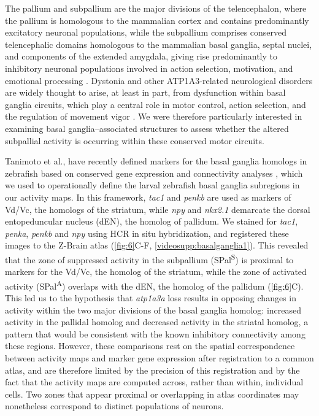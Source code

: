 \documentclass[9.5pt,lineno]{RandlettLab_elife}
\begin{document}
The pallium and subpallium are the major divisions of the telencephalon, where the pallium is homologous to the mammalian cortex and contains predominantly excitatory neuronal populations, while the subpallium comprises conserved telencephalic domains homologous to the mammalian basal ganglia, septal nuclei, and components of the extended amygdala, giving rise predominantly to inhibitory neuronal populations involved in action selection, motivation, and emotional processing \citep{Wullimann2004}.
Dystonia and other ATP1A3-related neurological disorders are widely thought to arise, at least in part, from dysfunction within basal ganglia circuits, which play a central role in motor control, action selection, and the regulation of movement vigor \citep{Brggemann2021}. 
We were therefore particularly interested in examining basal ganglia–associated structures to assess whether the altered subpallial activity is occurring within these conserved motor circuits.

Tanimoto et al., have recently defined markers for the basal ganglia homologs in zebrafish based on conserved gene expression and connectivity analyses \citep{Tanimoto2024}, which we used to operationally define the larval zebrafish basal ganglia subregions in our activity maps. 
In this framework, \emph{tac1} and \emph{penkb} are used as markers of Vd/Vc, the homologs of the striatum, while \emph{npy} and \emph{nkx2.1} demarcate the dorsal entopeduncular nucleus (dEN), the homolog of pallidum. 
We stained for \emph{tac1}, \emph{penka}, \emph{penkb} and \emph{npy} using HCR in situ hybridization, and registered these images to the Z-Brain atlas \citep{Randlett2015} (\autoref{fig:6}C-F, \autoref{videosupp:basalganglia1}).
This revealed that the zone of suppressed activity in the subpallium (SPal\textsuperscript{S}) is proximal to markers for the Vd/Vc, the homolog of the striatum, while the zone of activated activity (SPal\textsuperscript{A}) overlaps with the dEN, the homolog of the pallidum (\autoref{fig:6}C).
This led us to the hypothesis that \emph{atp1a3a} loss results in opposing changes in activity within the two major divisions of the basal ganglia homolog: increased activity in the pallidal homolog and decreased activity in the striatal homolog, a pattern that would be consistent with the known inhibitory connectivity among these regions.
However, these comparisons rest on the spatial correspondence between activity maps and marker gene expression after registration to a common atlas, and are therefore limited by the precision of this registration and by the fact that the activity maps are computed across, rather than within, individual cells.
Two zones that appear proximal or overlapping in atlas coordinates may nonetheless correspond to distinct populations of neurons.
\end{document}
